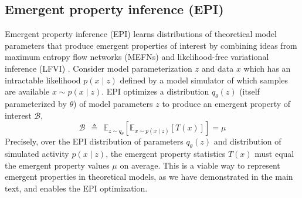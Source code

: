 \documentclass[11pt]{article}
\begin{document}
\subsection{Emergent property inference (EPI)}\label{methods_EPI}
Emergent property inference (EPI) learns distributions of theoretical model parameters that produce emergent properties of interest by combining ideas from maximum entropy flow networks (MEFNs) \cite{loaiza2017maximum} and likelihood-free variational inference (LFVI) \cite{tran2017hierarchical}.  
Consider model parameterization $z$ and data $x$ which has an intractable likelihood $p(x \mid z)$ defined by a model simulator of which samples are available $x \sim p(x \mid z)$.  
EPI optimizes a distribution $q_\theta(z)$ (itself parameterized by $\theta$) of model parameters $z$ to produce an emergent property of interest $\mathcal{B}$,
\begin{equation}
\mathcal{B} ~~\triangleq~~  \mathbb{E}_{z \sim q_\theta}\left[ \mathbb{E}_{x\sim p(x \mid z)}\left[T(x)\right] \right] = \mu
\end{equation}
Precisely, over the EPI distribution of parameters $q_\theta(z)$ and distribution of simulated activity $p(x \mid z)$, the emergent property statistics $T(x)$ must equal the emergent property values $\mu$ on average.  This is a viable way to represent emergent properties in theoretical models, as we have demonstrated in the main text, and enables the EPI optimization.
\end{document}
